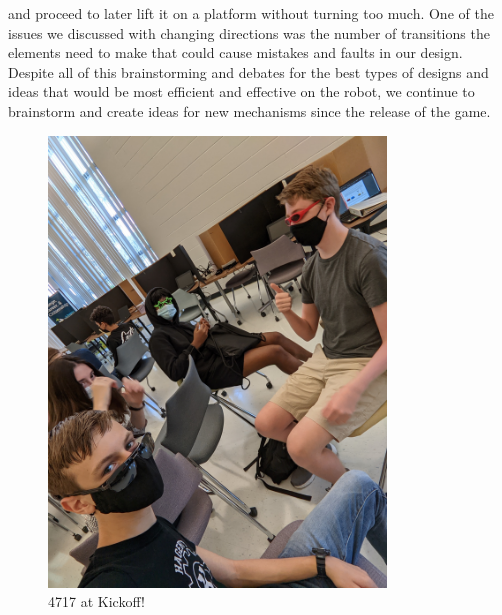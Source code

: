 and proceed to later lift it on a platform without turning too much. One of the issues we discussed with changing directions was the number of transitions the elements need to make that could cause mistakes and faults in our design. Despite all of this brainstorming and debates for the best types of designs and ideas that would be most efficient and effective on the robot, we continue to brainstorm and create ideas for new mechanisms since the release of the game. 
 

\begin{figure}[ht]
\centering
\begin{minipage}[b]{.50\textwidth}
  \centering
  \includegraphics[width=0.8\textwidth]{Meetings/September/09-18-21/PXL_20210918_151448302 - Jensen Miller.jpg}
  \caption{4717 at Kickoff!}
  \label{fig:pic1}
\end{minipage}%
\hfill%
\begin{minipage}[b]{.50\textwidth}
  \centering

\end{minipage}
\end{figure}
